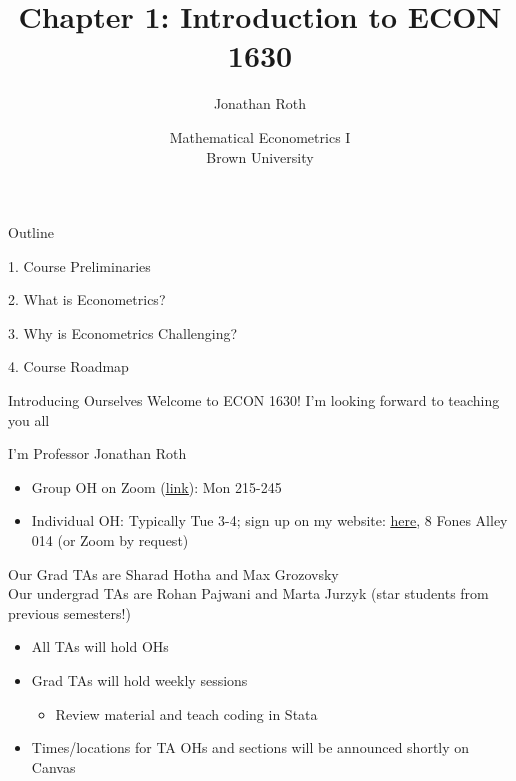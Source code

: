 \documentclass[11pt,english,handout]{beamer}
\begin{document}
\begin{frame}[noframenumbering]{}
\vspace{0.5cm}
\title[]{Chapter 1: Introduction to ECON 1630}
\author{Jonathan Roth}
\date{Mathematical Econometrics I \\ Brown University\\} 
\titlepage {\small{}\ }\thispagestyle{empty} \vspace{-30pt}

\end{frame}
 
\begin{frame}{Outline}

1. Course Preliminaries
\vspace{0.8cm}

2. What is Econometrics?
\vspace{0.8cm}

3. Why is Econometrics Challenging?
\vspace{0.8cm}

4. Course Roadmap

\end{frame}

\begin{frame}{Introducing Ourselves}
\vspace{0.2cm}
Welcome to ECON 1630! I'm looking forward to teaching you all
\vspace{0.5cm}


I'm Professor Jonathan Roth

\begin{itemize}
\item Group OH on Zoom (\href{https://brown.zoom.us/my/jonroth}{\uline{link}}): Mon 215-245 
\item Individual OH: Typically Tue 3-4; sign up on my website: \href{https://jonathandroth.github.io/OfficeHours/}{\uline{here}}, 8 Fones Alley 014 (or Zoom by request)

\end{itemize}
\vspace{0.4cm}

\pause{}

Our Grad TAs are Sharad Hotha and Max Grozovsky \\

Our undergrad TAs are Rohan Pajwani and Marta Jurzyk (star students from previous semesters!)

\begin{itemize}
	\item
	All TAs will hold OHs 
	
	\item
	Grad TAs will hold weekly sessions 
	
	\begin{itemize}
		\item 
		Review material and teach coding in Stata
	\end{itemize}
	
	\item
	Times/locations for TA OHs  and sections will be announced shortly on Canvas
\end{itemize}
 
\end{frame}
\end{document}

